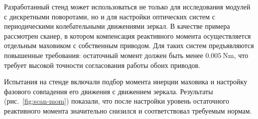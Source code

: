 Разработанный стенд может использоваться не только для исследования модулей с дискретными поворотами, но и для настройки оптических систем с периодическими колебательными движениями зеркал. В качестве примера рассмотрен сканер, в котором компенсация реактивного момента осуществляется отдельным маховиком с собственным приводом. Для таких систем предъявляются повышенные требования: остаточный момент должен быть менее $\SI{0,005}{\newton\meter}$, что требует высокой точности согласования работы обоих приводов.

Испытания на стенде включали подбор момента инерции маховика и настройку фазового совпадения его движения с движением зеркала. Результаты (рис.~\ref{fig:scan-mom}) показали, что после настройки уровень остаточного реактивного момента значительно снизился и соответствовал требуемым нормам.

